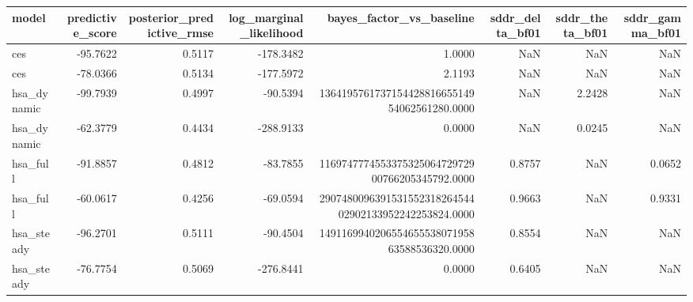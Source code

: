 \begin{tabular}{lrrrrrrr}
\toprule
model & predictive\_score & posterior\_predictive\_rmse & log\_marginal\_likelihood & bayes\_factor\_vs\_baseline & sddr\_delta\_bf01 & sddr\_theta\_bf01 & sddr\_gamma\_bf01 \\
\midrule
ces & -95.7622 & 0.5117 & -178.3482 & 1.0000 & NaN & NaN & NaN \\
ces & -78.0366 & 0.5134 & -177.5972 & 2.1193 & NaN & NaN & NaN \\
hsa\_dynamic & -99.7939 & 0.4997 & -90.5394 & 136419576173715442881665514954062561280.0000 & NaN & 2.2428 & NaN \\
hsa\_dynamic & -62.3779 & 0.4434 & -288.9133 & 0.0000 & NaN & 0.0245 & NaN \\
hsa\_full & -91.8857 & 0.4812 & -83.7855 & 116974777455337532506472972900766205345792.0000 & 0.8757 & NaN & 0.0652 \\
hsa\_full & -60.0617 & 0.4256 & -69.0594 & 290748009639153155231826454402902133952242253824.0000 & 0.9663 & NaN & 0.9331 \\
hsa\_steady & -96.2701 & 0.5111 & -90.4504 & 149116994020655465553807195863588536320.0000 & 0.8554 & NaN & NaN \\
hsa\_steady & -76.7754 & 0.5069 & -276.8441 & 0.0000 & 0.6405 & NaN & NaN \\
\bottomrule
\end{tabular}
